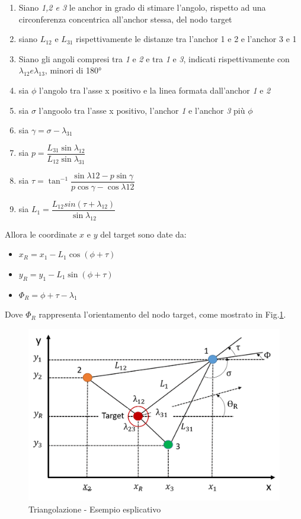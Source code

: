 \begin{enumerate}
   \item Siano \textit{1,2 e 3} le anchor in grado di stimare l'angolo, rispetto ad una circonferenza concentrica all'anchor stessa, del nodo target
   \item siano $L_{12}$ e $L_{31}$ rispettivamente le distanze tra l'anchor 1 e 2 e l'anchor 3 e 1
   \item Siano gli angoli compresi tra \textit{1} e \textit{2} e tra \textit{1} e \textit{3}, indicati rispettivamente con $\lambda_{12} e \lambda_{13}$, minori di 180°
   \item sia $\phi$ l'angolo tra l'asse x positivo e la linea formata dall'anchor \textit{1} e \textit{2}
   \item sia $\sigma$ l'angoolo tra l'asse x positivo, l'anchor \textit{1} e l'anchor \textit{3} più $\phi$
   \item sia $\gamma= \sigma - \lambda_{31}$
   \item sia $p= \dfrac{L_{31} \sin\lambda_{12}}{L_{12} \sin\lambda_{31}}$
   \item sia $\tau= \tan^{-1} \dfrac{\sin\lambda{12}-p \sin\gamma}{p \cos\gamma-\cos\lambda{12}}$
   \item sia $L_1 = \dfrac{L_{12} sin(\tau+\lambda_{12})}{\sin\lambda_{12}}$
\end{enumerate}

Allora le coordinate $x$ e $y$ del target sono date da:
\begin{itemize}
	\item $x_R = x_1 - L_1  \cos(\phi + \tau)$
	\item $y_R = y_1 - L_1  \sin(\phi + \tau)$
	\item $\Phi_R = \phi + \tau - \lambda_1$
\end{itemize}
Dove $\Phi_R$ rappresenta l'orientamento del nodo target, come mostrato in Fig.\ref{fig:triangolazione}.


\begin{figure}[H]  
	\centering 
	\includegraphics[scale=0.4]{ContestoApplicativo/triangolazione.png}
	\caption{Triangolazione - Esempio esplicativo}
	\label{fig:triangolazione}
\end{figure}





